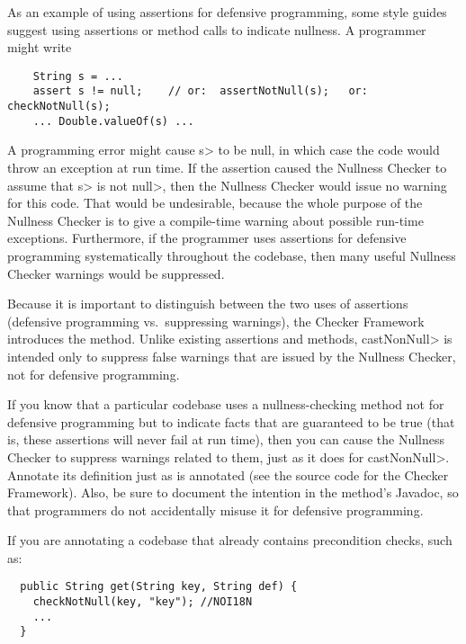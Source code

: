 As an example of using assertions for defensive programming, some style
guides suggest using assertions or method calls to indicate nullness.  A
programmer might write

\begin{Verbatim}
    String s = ...
    assert s != null;    // or:  assertNotNull(s);   or: checkNotNull(s);
    ... Double.valueOf(s) ...
\end{Verbatim}

A programming error might cause \<s> to be null, in which case the code
would throw an exception at run time.
If the assertion caused the Nullness Checker to assume that \<s> is not
\<null>, then the Nullness Checker would issue no warning for this code.
That would be undesirable, because the whole purpose of the Nullness
Checker is to give a compile-time warning about possible run-time
exceptions.  Furthermore, if the programmer uses assertions for defensive
programming systematically throughout the codebase, then many useful
Nullness Checker warnings would be suppressed.


Because it is important to distinguish between the two uses of assertions
(defensive programming vs.~suppressing warnings), the Checker Framework
introduces the  method.
Unlike existing assertions and
methods, \<castNonNull> is intended only to suppress false warnings that are
issued by the Nullness Checker, not for defensive programming.

If you know that a particular codebase uses
a nullness-checking method not for defensive programming but to indicate
facts that are guaranteed to be true (that is, these assertions will never
fail at run time), then you can cause the Nullness Checker to suppress
warnings related to them, just as it does for \<castNonNull>.
Annotate its definition just as
 is annotated (see the
source code for the Checker Framework).
Also, be sure to document the intention in the method's Javadoc, so that
programmers do not
accidentally misuse it for defensive programming.


If you are annotating a codebase that already contains precondition checks,
such as:

\begin{Verbatim}
  public String get(String key, String def) {
    checkNotNull(key, "key"); //NOI18N
    ...
  }
\end{Verbatim}


